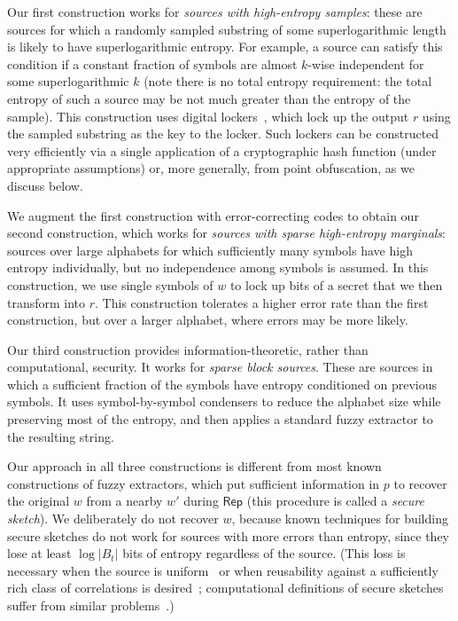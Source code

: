 \documentclass[11pt]{article}
\newcommand{\class}[1]{{\ensuremath{\mathsf{#1}}}}
\newcommand{\rep}{\ensuremath{\class{Rep}}\xspace}
\begin{document}
Our first construction works for \emph{sources with high-entropy samples}: these are sources for which a randomly sampled substring of some superlogarithmic length is likely to have superlogarithmic  entropy. For example, a source can satisfy this condition if a constant fraction of symbols are almost $k$-wise independent for some superlogarithmic $k$ (note there is no total entropy requirement:  the total entropy of such a source may be not  much greater than the entropy of the sample). This construction uses digital lockers~\cite{canetti2008obfuscating}, which lock up the output $r$ using the sampled substring as the key to the locker. Such lockers can be constructed very efficiently via a single application of a cryptographic hash function (under appropriate assumptions) or, more generally, from point obfuscation, as we discuss below.

We augment the first construction with error-correcting codes to obtain our second construction, which works for \emph{sources with sparse high-entropy marginals}: sources over large alphabets for which sufficiently many symbols have high entropy individually, but no independence among symbols is assumed. In this construction, we use single symbols of $w$ to lock up bits of a secret that we then transform into $r$. This construction tolerates a higher error rate than the first construction, but over a larger alphabet, where errors may be more likely. 

Our third construction provides information-theoretic, rather than computational, security. It works for \emph{sparse block sources}. These are sources in which a sufficient fraction of the symbols have entropy conditioned on previous symbols. It uses symbol-by-symbol condensers to reduce the alphabet size while preserving most of the entropy, and then applies a standard fuzzy extractor to the resulting string.

Our approach in all three constructions is different from most known constructions of fuzzy extractors, which put sufficient information in $p$ to recover the original $w$ from a nearby $w'$ during $\rep$ (this procedure is called a \emph{secure sketch}). We deliberately do not recover $w$, because known techniques for building secure sketches do not work for sources with more errors than entropy, since they lose at least $\log |B_t|$ bits of entropy regardless of the source. (This loss is necessary when the source is uniform~\cite[Lemma C.1]{DBLP:journals/siamcomp/DodisORS08} or when reusability against a sufficiently rich class of correlations is desired~\cite[Theorem 11]{Boyen2004}; computational definitions of secure sketches suffer from similar problems~\cite[Corollary 3.8, Theorem 3.10]{fuller2013computational}.)
\end{document}
